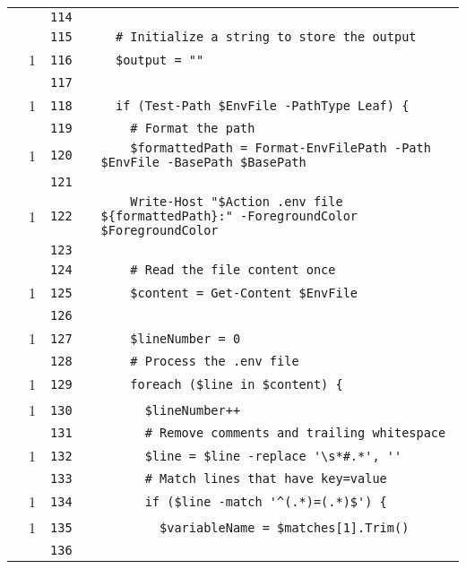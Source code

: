 \documentclass[a4paper,landscape,10pt]{article}
\begin{document}
\begin{longtable}[l]{lrrll}
\cellcolor{gray} &  & \verb~114~ & & \verb~~\\
\cellcolor{gray} &  & \verb~115~ & & \verb~  # Initialize a string to store the output~\\
\cellcolor{green} & 1 & \verb~116~ & & \verb~  $output = ""~\\
\cellcolor{gray} &  & \verb~117~ & & \verb~~\\
\cellcolor{green} & 1 & \verb~118~ & & \verb~  if (Test-Path $EnvFile -PathType Leaf) {~\\
\cellcolor{gray} &  & \verb~119~ & & \verb~    # Format the path~\\
\cellcolor{green} & 1 & \verb~120~ & & \verb~    $formattedPath = Format-EnvFilePath -Path $EnvFile -BasePath $BasePath~\\
\cellcolor{gray} &  & \verb~121~ & & \verb~~\\
\cellcolor{green} & 1 & \verb~122~ & & \verb~    Write-Host "$Action .env file ${formattedPath}:" -ForegroundColor $ForegroundColor~\\
\cellcolor{gray} &  & \verb~123~ & & \verb~~\\
\cellcolor{gray} &  & \verb~124~ & & \verb~    # Read the file content once~\\
\cellcolor{green} & 1 & \verb~125~ & & \verb~    $content = Get-Content $EnvFile~\\
\cellcolor{gray} &  & \verb~126~ & & \verb~~\\
\cellcolor{green} & 1 & \verb~127~ & & \verb~    $lineNumber = 0~\\
\cellcolor{gray} &  & \verb~128~ & & \verb~    # Process the .env file~\\
\cellcolor{green} & 1 & \verb~129~ & & \verb~    foreach ($line in $content) {~\\
\cellcolor{green} & 1 & \verb~130~ & & \verb~      $lineNumber++~\\
\cellcolor{gray} &  & \verb~131~ & & \verb~      # Remove comments and trailing whitespace~\\
\cellcolor{green} & 1 & \verb~132~ & & \verb~      $line = $line -replace '\s*#.*', ''~\\
\cellcolor{gray} &  & \verb~133~ & & \verb~      # Match lines that have key=value~\\
\cellcolor{green} & 1 & \verb~134~ & & \verb~      if ($line -match '^(.*)=(.*)$') {~\\
\cellcolor{green} & 1 & \verb~135~ & & \verb~        $variableName = $matches[1].Trim()~\\
\cellcolor{gray} &  & \verb~136~ & & \verb~~\\

\end{longtable}
\end{document}
